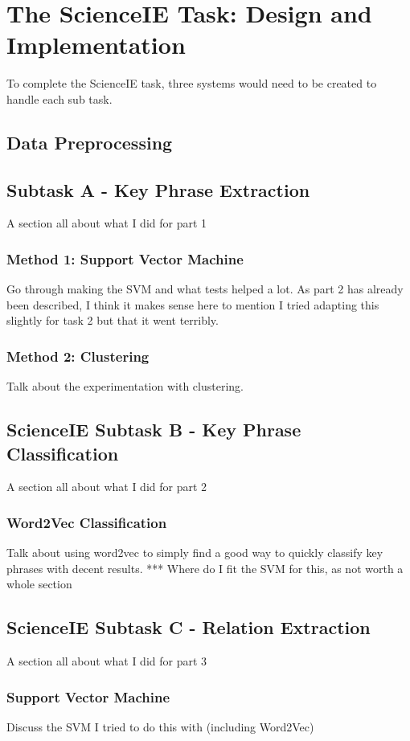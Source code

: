 \section{The ScienceIE Task: Design and Implementation}

To complete the ScienceIE task, three systems would need to be created to handle each sub task. 

\subsection{Data Preprocessing}

\subsection{Subtask A - Key Phrase Extraction}
A section all about what I did for part 1
\subsubsection{Method 1: Support Vector Machine}
Go through making the SVM and what tests helped a lot. 
As part 2 has already been described, I think it makes sense here to mention I tried adapting this slightly for task 2 but that it went terribly.
\subsubsection{Method 2: Clustering}
Talk about the experimentation with clustering.

\subsection{ScienceIE Subtask B - Key Phrase Classification}
A section all about what I did for part 2
\subsubsection{Word2Vec Classification}
Talk about using word2vec to simply find a good way to quickly classify key phrases with decent results.
*** Where do I fit the SVM for this, as not worth a whole section

\subsection{ScienceIE Subtask C - Relation Extraction}
A section all about what I did for part 3
\subsubsection{Support Vector Machine}
Discuss the SVM I tried to do this with (including Word2Vec)

